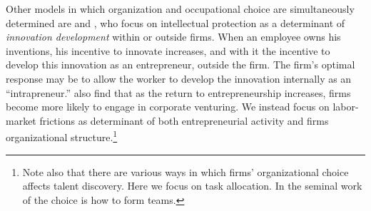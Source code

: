 \documentclass[12pt,american]{paper}
\theoremstyle{remark}
\begin{document}

Other models in which organization and occupational choice are simultaneously determined are \cite{Hellmann:2007tk} and \cite{de2008corporate}, who focus on intellectual protection as a determinant of \textit{innovation development} within or outside firms. When an employee owns his  inventions, his incentive to innovate increases, and with it the incentive to develop this innovation as an entrepreneur, outside the firm.  The firm's optimal response may be to allow the worker to develop the innovation internally as an ``intrapreneur.'' \citet{de2008corporate} also find that as the return to entrepreneurship increases, firms become more likely to engage in corporate venturing. We instead focus on labor-market frictions as determinant of both entrepreneurial activity and firms organizational structure.\footnote{Note also that there are various ways in which firms' organizational choice affects talent discovery. Here we focus on task allocation. In the seminal work of \cite{Meyer1994} the choice is how to form teams. }
\end{document}
